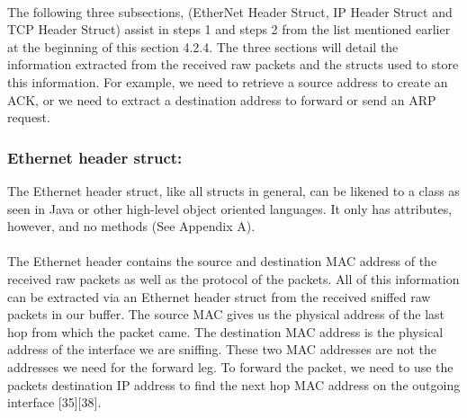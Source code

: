\documentclass{uathesis}
\begin{document}
\\

The following three subsections, (EtherNet Header Struct, IP Header Struct and TCP Header Struct) assist in steps 1 and steps 2 from the list mentioned earlier at the beginning of this section 4.2.4. The three sections will detail the information extracted from the received raw packets and the structs used to store this information. For example, we need to retrieve a source address to create an ACK, or we need to extract a destination address to forward or send an ARP request. 

\subsubsection*{Ethernet header struct:}
The Ethernet header struct, like all structs in general, can be likened to a class as seen in Java or other high-level object oriented languages. It only has attributes, however, and no methods (See Appendix A).  \\ 

\\

The Ethernet header contains the source and destination MAC address of the received raw packets as well as the protocol of the packets. All of this information can be extracted via an Ethernet header struct from the received sniffed raw packets in our buffer. The source MAC gives us the physical address of the last hop from which the packet came. The destination MAC address is the physical address of the interface we are sniffing. These two MAC addresses are not the addresses we need for the forward leg. To forward the packet, we need to use the packets destination IP address to find the next hop MAC address on the outgoing interface [35][38]. \\
\end{document}
